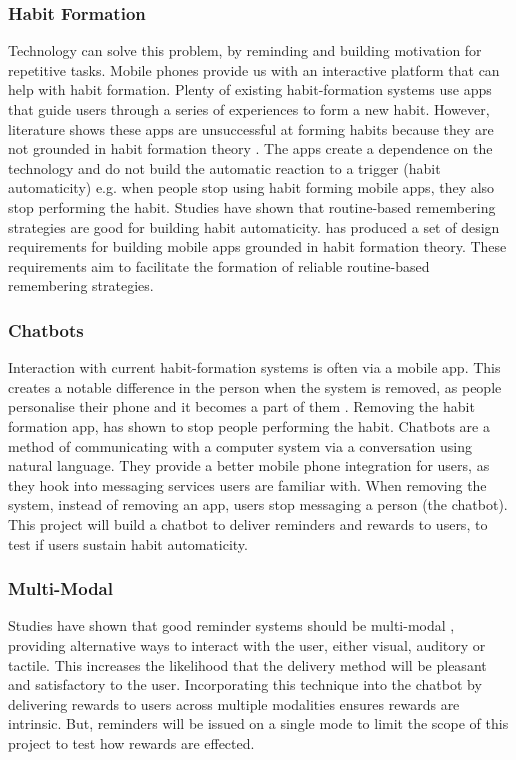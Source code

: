 \subsubsection*{Habit Formation}
Technology can solve this problem, by reminding and building motivation for repetitive tasks. Mobile phones provide us with an interactive platform that can help with habit formation. Plenty of existing habit-formation systems use apps that guide users through a series of experiences to form a new habit. However, literature shows these apps are unsuccessful at forming habits because they are not grounded in habit formation theory \cite{article_beyond_self_tracking_designing_apps}. The apps create a dependence on the technology and do not build the automatic reaction to a trigger (habit automaticity) e.g. when people stop using habit forming mobile apps, they also stop performing the habit.\newline
\newline
Studies have shown that routine-based remembering strategies are good for building habit automaticity. \cite{article_dont_forget_your_pill} has produced a set of design requirements for building mobile apps grounded in habit formation theory. These requirements aim to facilitate the formation of reliable routine-based remembering strategies.

\subsubsection*{Chatbots}
Interaction with current habit-formation systems is often via a mobile app. This creates a notable difference in the person when the system is removed, as people personalise their phone and it becomes a part of them \cite{article_my_phone_is_part_of_my_soul}. Removing the habit formation app, has shown to stop people performing the habit.\newline
\newline
Chatbots are a method of communicating with a computer system via a conversation using natural language. They provide a better mobile phone integration for users, as they hook into messaging services users are familiar with. When removing the system, instead of removing an app, users stop messaging a person (the chatbot). This project will build a chatbot to deliver reminders and rewards to users, to test if users sustain habit automaticity.

\subsubsection*{Multi-Modal}
Studies have shown that good reminder systems should be multi-modal \cite{article_designing_multimodal_reminders_for_home}, providing alternative ways to interact with the user, either visual, auditory or tactile. This increases the likelihood that the delivery method will be pleasant and satisfactory to the user. Incorporating this technique into the chatbot by delivering rewards to users across multiple modalities ensures rewards are intrinsic. But, reminders will be issued on a single mode to limit the scope of this project to test how rewards are effected.

